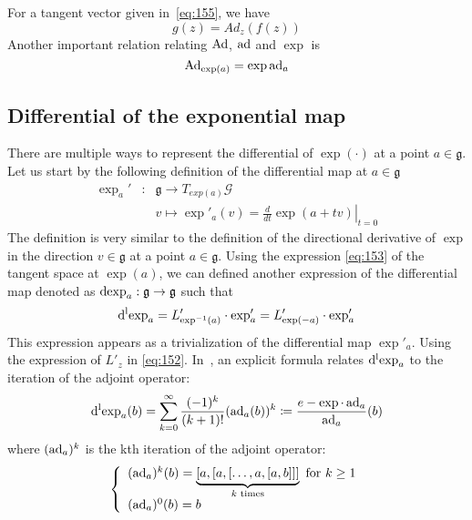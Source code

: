 For a tangent vector given in~\eqref{eq:155}, we have
\begin{equation}
  \label{eq:151}
  g(z) = Ad_z(f(z))
\end{equation}
Another important relation relating $\operatorname{Ad}$, $\operatorname{ad}$ and $\exp$ is
\begin{equation}
  \label{eq:164}
  \operatorname{Ad}_{\exp(a)} =\exp{\operatorname{ad}_a}
\end{equation}


\subsection{Differential of the exponential map} There are multiple ways to represent the differential of $\exp(\cdot)$ at a point $a\in \mathfrak g$. Let us start by the following definition of the differential map at $a\in\mathfrak g$
\begin{equation}
  \label{eq:147}
  \begin{array}{lcl}
    \exp_a' & : & \mathfrak g \rightarrow  T_{exp(a)}\mathcal G\\
            & &  v \mapsto \exp'_a(v)  = \left.\frac{d}{dt} \exp(a+tv)\right|_{t=0}
  \end{array}
\end{equation}
The definition is very similar to the definition of the directional derivative of $\exp$ in the direction $v \in \mathfrak g$ at a point $a\in\mathfrak g$. Using the expression \eqref{eq:153} of the tangent space at $\exp(a)$, we can defined another expression of the differential map denoted as $\operatorname{dexp}_a : \mathfrak g  \rightarrow \mathfrak g$ such that
\begin{equation}
  \label{eq:156}
  \operatorname{d^l exp}_a = L'_{\exp^{-1}(a)} \cdot \exp_a' = L'_{\exp(-a)} \cdot \exp_a' 
\end{equation}
This expression appears as a trivialization of the differential map $\exp'_a$. Using the expression of $L'_z$ in \eqref{eq:152}.
In~\cite[Theorem 2.14.13]{Varadarajan_book1984}, an explicit formula relates $\operatorname{d^l exp}_{a}$ to the iteration of the adjoint operator:
\begin{equation}
  \label{eq:43}
  \operatorname{d^l exp}_a(b) = \sum_{k=0}^\infty \frac{(-1)^k}{(k+1)!} (\operatorname{ad}_a(b))^k \coloneqq \frac{e - \exp\cdot\operatorname{ad}_a}{\operatorname{ad}_a}(b)
\end{equation}
where $(\operatorname{ad}_a)^k$ is the kth iteration of the adjoint operator:
\begin{equation}
  \label{eq:44}
  \left\{\begin{array}[l]{l}
    (\ad_a)^k(b) = \underbrace{[a, [ a, [ \ldots, a, [ a, b]]]}_{k \text{ times}} \text{ for } k \geq 1 \\
    (\ad_a)^0(b)  = b
  \end{array}\right.
\end{equation}
